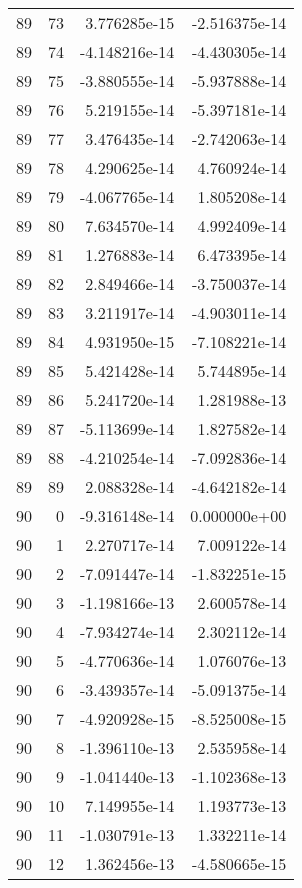 \begin{tabular}{rrrr}
  89 &   73 &  3.776285e-15 & -2.516375e-14 \\
  89 &   74 & -4.148216e-14 & -4.430305e-14 \\
  89 &   75 & -3.880555e-14 & -5.937888e-14 \\
  89 &   76 &  5.219155e-14 & -5.397181e-14 \\
  89 &   77 &  3.476435e-14 & -2.742063e-14 \\
  89 &   78 &  4.290625e-14 &  4.760924e-14 \\
  89 &   79 & -4.067765e-14 &  1.805208e-14 \\
  89 &   80 &  7.634570e-14 &  4.992409e-14 \\
  89 &   81 &  1.276883e-14 &  6.473395e-14 \\
  89 &   82 &  2.849466e-14 & -3.750037e-14 \\
  89 &   83 &  3.211917e-14 & -4.903011e-14 \\
  89 &   84 &  4.931950e-15 & -7.108221e-14 \\
  89 &   85 &  5.421428e-14 &  5.744895e-14 \\
  89 &   86 &  5.241720e-14 &  1.281988e-13 \\
  89 &   87 & -5.113699e-14 &  1.827582e-14 \\
  89 &   88 & -4.210254e-14 & -7.092836e-14 \\
  89 &   89 &  2.088328e-14 & -4.642182e-14 \\
  90 &    0 & -9.316148e-14 &  0.000000e+00 \\
  90 &    1 &  2.270717e-14 &  7.009122e-14 \\
  90 &    2 & -7.091447e-14 & -1.832251e-15 \\
  90 &    3 & -1.198166e-13 &  2.600578e-14 \\
  90 &    4 & -7.934274e-14 &  2.302112e-14 \\
  90 &    5 & -4.770636e-14 &  1.076076e-13 \\
  90 &    6 & -3.439357e-14 & -5.091375e-14 \\
  90 &    7 & -4.920928e-15 & -8.525008e-15 \\
  90 &    8 & -1.396110e-13 &  2.535958e-14 \\
  90 &    9 & -1.041440e-13 & -1.102368e-13 \\
  90 &   10 &  7.149955e-14 &  1.193773e-13 \\
  90 &   11 & -1.030791e-13 &  1.332211e-14 \\
  90 &   12 &  1.362456e-13 & -4.580665e-15 \\

\end{tabular}
